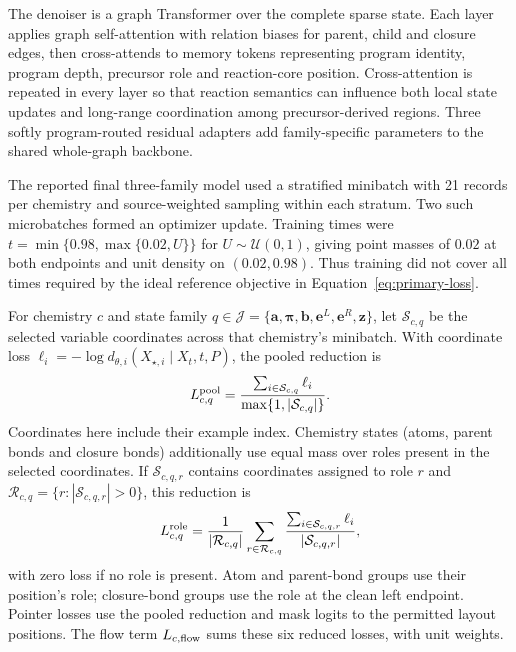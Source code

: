 \documentclass{article}
\theoremstyle{definition}
\begin{document}
The denoiser is a graph Transformer over the complete sparse state. Each layer applies graph
self-attention with relation biases for parent, child and closure edges, then cross-attends to memory
tokens representing program identity, program depth, precursor role and reaction-core position.
Cross-attention is repeated in every layer so that reaction semantics can influence both local state
updates and long-range coordination among precursor-derived regions. Three softly program-routed
residual adapters add family-specific parameters to the shared whole-graph backbone.

The reported final three-family model used a stratified minibatch with 21 records per chemistry
and source-weighted sampling within each stratum. Two such microbatches formed an optimizer update.
Training times were $t=\min\{0.98,\max\{0.02,U\}\}$ for $U\sim\mathcal U(0,1)$, giving point
masses of $0.02$ at both endpoints and unit density on $(0.02,0.98)$. Thus training did not cover
all times required by the ideal reference objective in Equation~\ref{eq:primary-loss}.

For chemistry $c$ and state family
$q\in\mathscr J=\{\mathbf a,\boldsymbol\pi,\mathbf b,\mathbf e^L,\mathbf e^R,\mathbf z\}$,
let $\mathcal S_{c,q}$ be the selected variable coordinates across that chemistry's minibatch.
With coordinate loss $\ell_i=-\log d_{\theta,i}(X_{\star,i}\mid X_t,t,P)$, the pooled reduction is
\begin{equation}
 L_{c,q}^{\rm pool}=\frac{\sum_{i\in\mathcal S_{c,q}}\ell_i}{\max\{1,|\mathcal S_{c,q}|\}}.
\end{equation}
Coordinates here include their example index. Chemistry states (atoms, parent bonds and closure
bonds) additionally use equal mass over roles present in the selected coordinates. If
$\mathcal S_{c,q,r}$ contains coordinates assigned to role $r$ and
$\mathcal R_{c,q}=\{r:|\mathcal S_{c,q,r}|>0\}$, this reduction is
\begin{equation}
 L_{c,q}^{\rm role}=\frac{1}{|\mathcal R_{c,q}|}
 \sum_{r\in\mathcal R_{c,q}}\frac{\sum_{i\in\mathcal S_{c,q,r}}\ell_i}{|\mathcal S_{c,q,r}|},
 \label{eq:role-balanced-loss}
\end{equation}
with zero loss if no role is present. Atom and parent-bond groups use their position's role;
closure-bond groups use the role at the clean left endpoint. Pointer losses use the pooled reduction
and mask logits to the permitted layout positions. The flow term $L_{c,\rm flow}$ sums these six
reduced losses, with unit weights.
\end{document}
